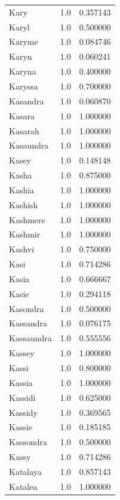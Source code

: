 \documentclass[
  letterpaper,
  DIV=11,
  numbers=noendperiod]{scrreprt}
\begin{document}
\begin{tabular}{lrr}
Kary            &   1.0 &   0.357143 \\
Karyl           &   1.0 &   0.500000 \\
Karyme          &   1.0 &   0.084746 \\
Karyn           &   1.0 &   0.060241 \\
Karyna          &   1.0 &   0.400000 \\
Karyssa         &   1.0 &   0.700000 \\
Kasandra        &   1.0 &   0.060870 \\
Kasara          &   1.0 &   1.000000 \\
Kasarah         &   1.0 &   1.000000 \\
Kasaundra       &   1.0 &   1.000000 \\
Kasey           &   1.0 &   0.148148 \\
Kasha           &   1.0 &   0.875000 \\
Kashia          &   1.0 &   1.000000 \\
Kashish         &   1.0 &   1.000000 \\
Kashmere        &   1.0 &   1.000000 \\
Kashmir         &   1.0 &   1.000000 \\
Kashvi          &   1.0 &   0.750000 \\
Kasi            &   1.0 &   0.714286 \\
Kasia           &   1.0 &   0.666667 \\
Kasie           &   1.0 &   0.294118 \\
Kasondra        &   1.0 &   0.500000 \\
Kassandra       &   1.0 &   0.076175 \\
Kassaundra      &   1.0 &   0.555556 \\
Kassey          &   1.0 &   1.000000 \\
Kassi           &   1.0 &   0.800000 \\
Kassia          &   1.0 &   1.000000 \\
Kassidi         &   1.0 &   0.625000 \\
Kassidy         &   1.0 &   0.369565 \\
Kassie          &   1.0 &   0.185185 \\
Kassondra       &   1.0 &   0.500000 \\
Kassy           &   1.0 &   0.714286 \\
Katalaya        &   1.0 &   0.857143 \\
Katalea         &   1.0 &   1.000000 \\

\end{tabular}
\end{document}
